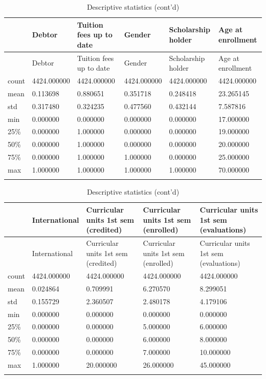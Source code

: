 \documentclass[
  letterpaper,
  DIV=11,
  numbers=noendperiod]{scrartcl}
\begin{document}
\hypertarget{tab-descstat-4}{}
\begin{longtable}[]{@{}llllll@{}}
\toprule\noalign{}
& Debtor & Tuition fees up to date & Gender & Scholarship holder & Age
at enrollment \\
\midrule\noalign{}
\endfirsthead
\toprule\noalign{}
& Debtor & Tuition fees up to date & Gender & Scholarship holder & Age
at enrollment \\
\midrule\noalign{}
\endhead
\bottomrule\noalign{}
\endlastfoot
count & 4424.000000 & 4424.000000 & 4424.000000 & 4424.000000 &
4424.000000 \\
mean & 0.113698 & 0.880651 & 0.351718 & 0.248418 & 23.265145 \\
std & 0.317480 & 0.324235 & 0.477560 & 0.432144 & 7.587816 \\
min & 0.000000 & 0.000000 & 0.000000 & 0.000000 & 17.000000 \\
25\% & 0.000000 & 1.000000 & 0.000000 & 0.000000 & 19.000000 \\
50\% & 0.000000 & 1.000000 & 0.000000 & 0.000000 & 20.000000 \\
75\% & 0.000000 & 1.000000 & 1.000000 & 0.000000 & 25.000000 \\
max & 1.000000 & 1.000000 & 1.000000 & 1.000000 & 70.000000 \\
\caption{Descriptive statistics (cont'd) }\tabularnewline
\end{longtable}

\hypertarget{tab-descstat-5}{}
\begin{longtable}[]{@{}lllll@{}}
\toprule\noalign{}
& International & Curricular units 1st sem (credited) & Curricular units
1st sem (enrolled) & Curricular units 1st sem (evaluations) \\
\midrule\noalign{}
\endfirsthead
\toprule\noalign{}
& International & Curricular units 1st sem (credited) & Curricular units
1st sem (enrolled) & Curricular units 1st sem (evaluations) \\
\midrule\noalign{}
\endhead
\bottomrule\noalign{}
\endlastfoot
count & 4424.000000 & 4424.000000 & 4424.000000 & 4424.000000 \\
mean & 0.024864 & 0.709991 & 6.270570 & 8.299051 \\
std & 0.155729 & 2.360507 & 2.480178 & 4.179106 \\
min & 0.000000 & 0.000000 & 0.000000 & 0.000000 \\
25\% & 0.000000 & 0.000000 & 5.000000 & 6.000000 \\
50\% & 0.000000 & 0.000000 & 6.000000 & 8.000000 \\
75\% & 0.000000 & 0.000000 & 7.000000 & 10.000000 \\
max & 1.000000 & 20.000000 & 26.000000 & 45.000000 \\
\caption{Descriptive statistics (cont'd) }\tabularnewline
\end{longtable}
\end{document}
